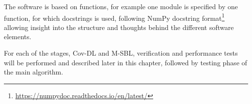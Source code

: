 The software is based on functions, for example one module is specified by one function, for which docstrings is used, following NumPy docstring format\footnote{\url{https://numpydoc.readthedocs.io/en/latest/}} allowing insight into the structure and thoughts behind the different software elements.

For each of the stages, Cov-DL and M-SBL, verification and performance tests will be performed and described later in this chapter, followed by testing phase of the main algorithm. 

